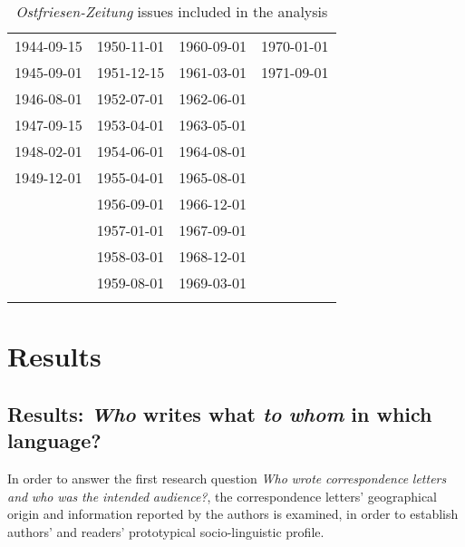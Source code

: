\documentclass[output=paper]{langsci/langscibook}
\begin{document}
\begin{table} 
\begin{tabular}{llll}
\lsptoprule
\multicolumn{4}{c}{Volume by date} \\
\midrule
1944-09-15 & 1950-11-01 & 1960-09-01 & 1970-01-01\\
1945-09-01 & 1951-12-15 & 1961-03-01 & 1971-09-01\\
1946-08-01 & 1952-07-01 & 1962-06-01 & \\
1947-09-15 & 1953-04-01 & 1963-05-01 & \\
1948-02-01 & 1954-06-01 & 1964-08-01 & \\
1949-12-01 & 1955-04-01 & 1965-08-01 & \\
 & 1956-09-01 & 1966-12-01 & \\
 & 1957-01-01 & 1967-09-01 & \\
 & 1958-03-01 & 1968-12-01 & \\
 & 1959-08-01 & 1969-03-01 & \\
\lspbottomrule
\end{tabular}
\caption{\textit{Ostfriesen-Zeitung} issues included in the analysis\label{tab:rocker:1}}
\end{table}



\section{Results} %
\label{sec:rocker:4}


\subsection{Results: \textit{Who} writes what \textit{to} \textit{whom} in which language?} %
\label{sec:rocker:4.1}

In order to answer the first research question \textit{Who} \textit{wrote} \textit{correspondence} \textit{letters} \textit{and} \textit{who} \textit{was} \textit{the} \textit{intended} \textit{audience?}, the correspondence letters’ geographical origin and information reported by the authors is examined, in order to establish authors’ and readers’ prototypical socio-linguistic profile.
\end{document}
